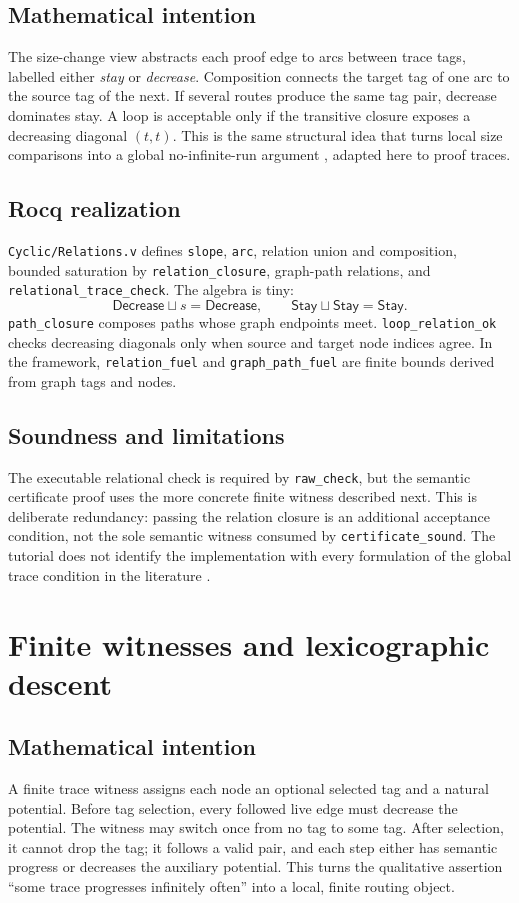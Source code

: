 \documentclass[11pt,oneside]{book}
\DeclareRobustCommand{\code}[1]{\nolinkurl{#1}}
\DeclareRobustCommand{\file}[1]{\nolinkurl{#1}}
\newcommand{\mathintent}{\subsection*{Mathematical intention}}
\newcommand{\rocqreal}{\subsection*{Rocq realization}}
\newcommand{\soundlim}{\subsection*{Soundness and limitations}}
\begin{document}
\mathintent

The size-change view abstracts each proof edge to arcs between trace tags,
labelled either \emph{stay} or \emph{decrease}.  Composition connects the
target tag of one arc to the source tag of the next.  If several routes produce
the same tag pair, decrease dominates stay.  A loop is acceptable only if the
transitive closure exposes a decreasing diagonal \((t,t)\).  This is the same
structural idea that turns local size comparisons into a global no-infinite-run
argument \cite{lee2001sizechange}, adapted here to proof traces.

\rocqreal

\file{Cyclic/Relations.v} defines \code{slope}, \code{arc}, relation union and
composition, bounded saturation by \code{relation_closure}, graph-path
relations, and \code{relational_trace_check}.  The algebra is tiny:
\[
 \mathsf{Decrease}\sqcup s=\mathsf{Decrease},\qquad
 \mathsf{Stay}\sqcup\mathsf{Stay}=\mathsf{Stay}.
\]
\code{path_closure} composes paths whose graph endpoints meet.
\code{loop_relation_ok} checks decreasing diagonals only when source and target
node indices agree.  In the framework, \code{relation_fuel} and
\code{graph_path_fuel} are finite bounds derived from graph tags and nodes.

\soundlim

The executable relational check is required by \code{raw_check}, but the
semantic certificate proof uses the more concrete finite witness described
next.  This is deliberate redundancy: passing the relation closure is an
additional acceptance condition, not the sole semantic witness consumed by
\code{certificate_sound}.  The tutorial does not identify the implementation
with every formulation of the global trace condition in the literature
\cite{brotherston2005cyclic,brotherston2011sequent}.

\section{Finite witnesses and lexicographic descent}

\mathintent

A finite trace witness assigns each node an optional selected tag and a natural
potential.  Before tag selection, every followed live edge must decrease the
potential.  The witness may switch once from no tag to some tag.  After
selection, it cannot drop the tag; it follows a valid pair, and each step either
has semantic progress or decreases the auxiliary potential.  This turns the
qualitative assertion ``some trace progresses infinitely often'' into a local,
finite routing object.
\end{document}
